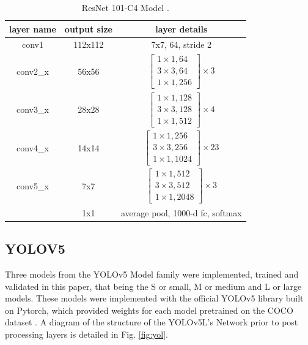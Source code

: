 \documentclass[conference]{IEEEtran}
\begin{document}
\begin{table}[H]
\begin{center}
\begin{tabular}{ |c|c|c| }
\hline
 layer name & output size & layer details \\ 
 \hline
 conv1 & 112x112 & 7x7, 64, stride 2 \\  
 \hline
 conv2\_x & 56x56 & $\begin{bmatrix}1\times1, 64\\3\times3, 64\\1\times1, 256\end{bmatrix}\times3$\\
 \hline
  conv3\_x & 28x28 & $\begin{bmatrix}1\times1, 128\\3\times3, 128\\1\times1, 512\end{bmatrix}\times4$\\
 \hline
  conv4\_x & 14x14 & $\begin{bmatrix}1\times1, 256\\3\times3, 256\\1\times1, 1024\end{bmatrix}\times23$\\
 \hline
  conv5\_x & 7x7 & $\begin{bmatrix}1\times1, 512\\3\times3, 512\\1\times1, 2048\end{bmatrix}\times3$\\
 \hline
  & 1x1 & average pool, 1000-d fc, softmax\\
 \hline
\end{tabular}
\vspace*{3mm}
\caption{\label{tab:R101}ResNet 101-C4 Model \cite{he2015deep}
.}
\end{center}
\end{table}


\subsection{YOLOV5}
Three models from the YOLOv5 Model family were implemented, trained and validated in this paper, that being the S or small, M or medium and L or large models. These models were implemented with the official YOLOv5 library built on Pytorch, which provided weights for each model pretrained on the COCO dataset \cite{lin2015microsoft}. A diagram of the structure of the YOLOv5L's Network prior to post processing layers is detailed in Fig. \ref{fig:yol}.
\end{document}
